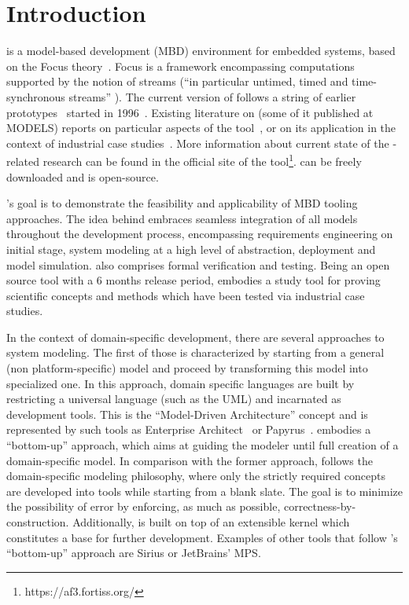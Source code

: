\section{Introduction}

\autofocus is a model-based development (MBD) environment for embedded systems,
based on the \textsf{Focus} theory~\cite{Broy:2001:SDI:374869}. \textsf{Focus} is a framework
encompassing computations supported by the notion of streams (“in particular
untimed, timed and time-synchronous streams”
\cite{Holzl:2007:AST:1927558.1927576}). The current version of \af follows a
string of earlier
prototypes~\cite{Holzl:2007:AST:1927558.1927576,DBLP:conf/models/AravantinosVTHS15}
started in 1996~\cite{Huber96autofocus--}. Existing literature on \af (some of
it published at MODELS) reports on particular aspects of the
tool~\cite{TMR2013,TMR2011,Lucio:17,DBLP:conf/se/VossEH14,Barner2016,Diewald2016,Carlan2017},
or on its application in the context of industrial case
studies~\cite{2009-a-top-down-methodology-for-the-development-of-automotive-software,2011KeylessEntry,Bohm:2014:FSE:2593850.2593856,DBLP:conf/models/AravantinosVTHS15,Barner2017,Eder2017}.
More information about current state of the \af-related research can be found in
the official site of the tool\footnote{ https://af3.fortiss.org/}. \af can be
freely downloaded and is open-source.

\af's goal is to demonstrate the feasibility and applicability of
MBD tooling approaches. The idea behind \af embraces seamless integration of all models throughout the
development process, encompassing requirements engineering on initial stage, system
modeling at a high level of abstraction, deployment and model simulation. \af
also comprises formal verification and testing. Being an open source tool with a 6 months
release period, \af embodies a study tool for proving scientific concepts and
methods which have been tested via industrial case studies.

In the context of domain-specific development, there are several approaches to
system modeling. The first of those is characterized by starting from a general
(non platform-specific) model and proceed by transforming this model into
specialized one. In this approach, domain specific languages are built by
restricting a universal language (such as the UML) and incarnated as development
tools. This is the “Model-Driven Architecture” concept and is represented by
such tools as Enterprise Architect~\cite{SparxSystems} or
Papyrus~\cite{Papyrus}. \af embodies a “bottom-up” approach, which aims at
guiding the modeler until full creation of a domain-specific model.
In comparison with the former approach, \af follows the domain-specific modeling
philosophy, where only the strictly required concepts are developed into tools while starting
from a blank slate. The goal is to minimize the possibility of error by
enforcing, as much as possible, correctness-by-construction. Additionally, \af
is built on top of an extensible kernel which constitutes a base for further
development. Examples of other tools that follow \af's ``bottom-up'' approach are
Sirius\cite{Sirius} or JetBrains' MPS\cite{MPS}.

